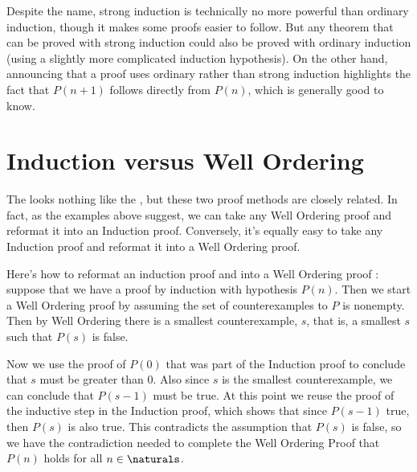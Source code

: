 Despite the name, strong induction is technically no more powerful than
ordinary induction, though it makes some proofs easier to follow.  But any
theorem that can be proved with strong induction could also be proved with
ordinary induction (using a slightly more complicated induction
hypothesis).  On the other hand, announcing that a proof uses ordinary
rather than strong induction highlights the fact that $P(n+1)$ follows
directly from $P(n)$, which is generally good to know.

\begin{problems}
\classproblems
{}
\end{problems}

\section{Induction versus Well Ordering}\label{versusWO}

The  looks nothing like the , but these two proof methods are closely related.  In fact,
as the examples above suggest, we can take any Well Ordering proof and
reformat it into an Induction proof.  Conversely, it's equally easy to
take any Induction proof and reformat it into a Well Ordering proof.

\begin{editingnotes}
Here's how to reformat an induction proof and into a Well
Ordering proof : suppose that we have a proof by induction with
hypothesis $P(n)$.  Then we start a Well Ordering proof by assuming the
set of counterexamples to $P$ is nonempty.  Then by Well Ordering there is
a smallest counterexample, $s$, that is, a smallest $s$ such that $P(s)$
is false.

Now we use the proof of $P(0)$ that was part of the Induction proof to
conclude that $s$ must be greater than 0.  Also since $s$ is the smallest
counterexample, we can conclude that $P(s-1)$ must be true.  At this point
we reuse the proof of the inductive step in the Induction proof, which
shows that since $P(s-1)$ true, then $P(s)$ is also true.  This
contradicts the assumption that $P(s)$ is false, so we have the
contradiction needed to complete the Well Ordering Proof that $P(n)$ holds
for all $n \in \naturals$.

\end{editingnotes}

